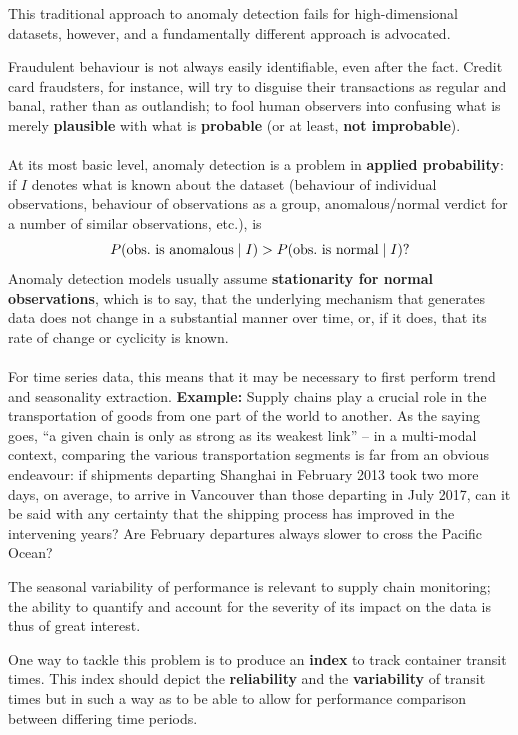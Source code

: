 \documentclass[20pt,landscape,footrule,headrule]{foils}
\def\fh{\foilhead}
\begin{document}
This traditional approach to anomaly detection fails for high-dimensional datasets, however, and a fundamentally different approach is advocated. 

\fh{6.1.1 -- Anomaly Detection as Statistical Learning} \label{6.1.1} 




Fraudulent behaviour is not always easily identifiable, even after the fact. Credit card fraudsters, for instance, will try to disguise their transactions as regular and banal, rather than as outlandish; to fool human observers into confusing what is merely \textbf{plausible} with what is \textbf{probable} (or at least, \textbf{not improbable}). \ \\ \ \\ At its most basic level, anomaly detection is a problem in \textbf{applied probability}: if $I$ denotes what is known about the dataset (behaviour of individual observations, behaviour of observations as a group, anomalous/normal verdict for a number of similar observations, etc.), is $$P(\text{obs.\@ is anomalous}\mid I) > P(\text{obs.\@ is normal}\mid I)?$$ 
Anomaly detection models usually assume \textbf{stationarity for normal observations}, which is to say, that the underlying mechanism that generates data does not change in a substantial manner over time, or, if it does, that its rate of change or cyclicity is known.  \ \\ \ \\ For time series data, this means that it may be necessary to first perform trend and seasonality extraction.
\textbf{Example:} Supply chains play a crucial role in the transportation of goods from one part of the world to another. As the saying goes, ``a given chain is only as strong as its weakest link'' -- in a multi-modal context, comparing the various transportation segments is far from an obvious endeavour: if shipments departing Shanghai in February 2013 took two more days, on average, to arrive in Vancouver than those departing in July 2017, can it be said with any certainty that the shipping process has improved in the intervening years? Are February departures always slower to cross the Pacific Ocean? \par The seasonal variability of performance is relevant to supply chain monitoring; the ability to quantify and account for the severity of its impact on the data is thus of great interest. \par 
One way to tackle this problem is to produce an \textbf{index} to track container transit times. This index should depict the \textbf{reliability} and the \textbf{variability} of transit times but in such a way as to be able to allow for performance comparison between differing time periods. \ \\ \ \\ 
\end{document}
